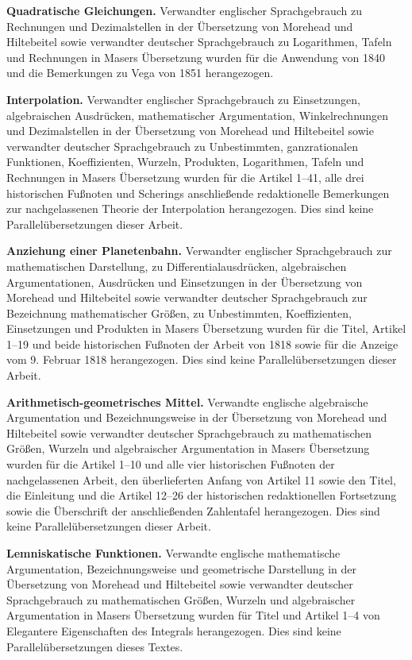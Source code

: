 \par\medskip\textbf{Quadratische Gleichungen.} Verwandter englischer Sprachgebrauch zu Rechnungen und Dezimalstellen in der Übersetzung von Morehead und Hiltebeitel sowie verwandter deutscher Sprachgebrauch zu Logarithmen, Tafeln und Rechnungen in Masers Übersetzung wurden für die Anwendung von 1840 und die Bemerkungen zu Vega von 1851 herangezogen.
\par\medskip\textbf{Interpolation.} Verwandter englischer Sprachgebrauch zu Einsetzungen, algebraischen Ausdrücken, mathematischer Argumentation, Winkelrechnungen und Dezimalstellen in der Übersetzung von Morehead und Hiltebeitel sowie verwandter deutscher Sprachgebrauch zu Unbestimmten, ganzrationalen Funktionen, Koeffizienten, Wurzeln, Produkten, Logarithmen, Tafeln und Rechnungen in Masers Übersetzung wurden für die Artikel 1–41, alle drei historischen Fußnoten und Scherings anschließende redaktionelle Bemerkungen zur nachgelassenen Theorie der Interpolation herangezogen. Dies sind keine Parallelübersetzungen dieser Arbeit.
\par\medskip\textbf{Anziehung einer Planetenbahn.} Verwandter englischer Sprachgebrauch zur mathematischen Darstellung, zu Differentialausdrücken, algebraischen Argumentationen, Ausdrücken und Einsetzungen in der Übersetzung von Morehead und Hiltebeitel sowie verwandter deutscher Sprachgebrauch zur Bezeichnung mathematischer Größen, zu Unbestimmten, Koeffizienten, Einsetzungen und Produkten in Masers Übersetzung wurden für die Titel, Artikel 1–19 und beide historischen Fußnoten der Arbeit von 1818 sowie für die Anzeige vom 9. Februar 1818 herangezogen. Dies sind keine Parallelübersetzungen dieser Arbeit.
\par\medskip\textbf{Arithmetisch-geometrisches Mittel.} Verwandte englische algebraische Argumentation und Bezeichnungsweise in der Übersetzung von Morehead und Hiltebeitel sowie verwandter deutscher Sprachgebrauch zu mathematischen Größen, Wurzeln und algebraischer Argumentation in Masers Übersetzung wurden für die Artikel 1–10 und alle vier historischen Fußnoten der nachgelassenen Arbeit, den überlieferten Anfang von Artikel 11 sowie den Titel, die Einleitung und die Artikel 12–26 der historischen redaktionellen Fortsetzung sowie die Überschrift der anschließenden Zahlentafel herangezogen. Dies sind keine Parallelübersetzungen dieser Arbeit.
\par\medskip\textbf{Lemniskatische Funktionen.} Verwandte englische mathematische Argumentation, Bezeichnungsweise und geometrische Darstellung in der Übersetzung von Morehead und Hiltebeitel sowie verwandter deutscher Sprachgebrauch zu mathematischen Größen, Wurzeln und algebraischer Argumentation in Masers Übersetzung wurden für Titel und Artikel 1–4 von Elegantere Eigenschaften des Integrals herangezogen. Dies sind keine Parallelübersetzungen dieses Textes.
